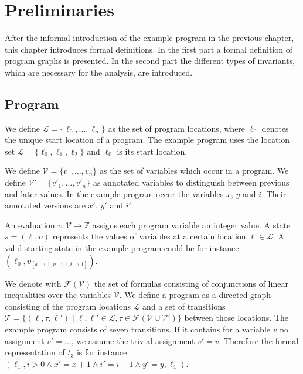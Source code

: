 \section{Preliminaries}
\label{sec:preliminaries}

After the informal introduction of the example program in the previous chapter, this chapter introduces formal definitions.
In the first part a formal definition of program graphs is presented.
In the second part the different types of invariants, which are necessary for the analysis, are introduced.

\subsection{Program}

We define $\mathcal{L} = \lbrace \ell_0, \dots, \ell_n \rbrace$ as the set of program locations, where $\ell_0$ denotes the unique start location of a program.
The example program uses the location set $\mathcal{L} = \lbrace \ell_0 , \ell_1 , \ell_2 \rbrace$ and $\ell_0$ is its start location.

We define $\mathcal{V} = \lbrace v_1, \dots, v_n \rbrace$ as the set of variables which occur in a program.
We define $\mathcal{V}' = \lbrace v'_1, \dots, v'_n \rbrace$ as annotated variables to distinguish between previous and later values.
In the example program occur the variables $x$, $y$ and $i$.
Their annotated versions are $x'$, $y'$ and $i'$.

An evaluation $\upsilon: \mathcal{V} \rightarrow \mathbb{Z}$ assigns each program variable an integer value.
A state $s = (\ell, \upsilon)$ represents the values of variables at a certain location $\ell \in \mathcal{L}$.
A valid starting state in the example program could be for instance $(\ell_0, \upsilon_{[x \rightarrow 1, y \rightarrow 1, i \rightarrow 1]})$.

We denote with $\mathcal{F}(\mathcal{V})$ the set of formulas consisting of conjunctions of linear inequalities over the variables $\mathcal{V}$.
We define a program as a directed graph consisting of the program locations $\mathcal{L}$ and a set of transitions $\mathcal{T} = \lbrace (\ell, \tau, \ell') \mid \ell, \ell' \in \mathcal{L}, \tau \in \mathcal{F}(\mathcal{V} \cup \mathcal{V}') \rbrace$ between those locations.
The example program consists of seven transitions.
If it contains for a variable $v$ no assignment $v' = \dots$, we assume the trivial assignment $v' = v$.
Therefore the formal representation of $t_3$ is for instance $(\ell_1, i > 0 \wedge x' = x + 1 \wedge i' = i - 1 \wedge y' = y,\ell_1)$.

